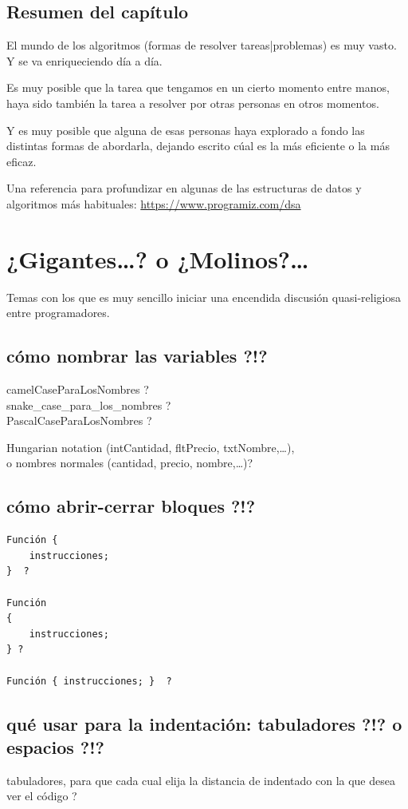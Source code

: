 \documentclass[spanish,12pt,a4paper,final,oneside]{book}
\begin{document}
\newpage
\section*{Resumen del capítulo}
El mundo de los algoritmos (formas de resolver tareas|problemas) es muy vasto. Y se va enriqueciendo día a día.

Es muy posible que la tarea que tengamos en un cierto momento entre manos, haya sido también la tarea a resolver por otras personas en otros momentos.

Y es muy posible que alguna de esas personas haya explorado a fondo las distintas formas de abordarla, dejando escrito cúal es la más eficiente o la más eficaz.


\vspace{2cm}
Una referencia para profundizar en algunas de las estructuras de datos y algoritmos más habituales: \url{https://www.programiz.com/dsa}


\chapter{¿Gigantes\ldots? o ¿Molinos?\ldots}
Temas con los que es muy sencillo iniciar una encendida discusión quasi-religiosa entre programadores. 

\section{cómo nombrar las variables ?!?}
camelCaseParaLosNombres ?
\\snake\_case\_para\_los\_nombres ?
\\PascalCaseParaLosNombres ?

\vspace{0.5cm}
Hungarian notation (intCantidad, fltPrecio, txtNombre,\ldots),
\\o nombres normales (cantidad, precio, nombre,\ldots)?

\section{cómo abrir-cerrar bloques ?!?}
\begin{lstlisting}[frame=single]
Función {
    instrucciones;
}  ?

Función
{
    instrucciones;
} ?

Función { instrucciones; }  ?
\end{lstlisting}

\section{qué usar para la indentación: tabuladores ?!? o espacios ?!? }
tabuladores, para que cada cual elija la distancia de indentado con la que desea ver el código ?
\end{document}
